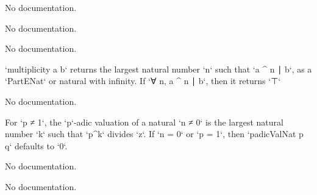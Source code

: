 \begin{definition}\label{CompleteValuationField}
        \leanok
                No documentation.
    \end{definition}

\begin{definition}\label{CompleteDiscreteValuationField}
        \leanok
                No documentation.
    \end{definition}

\begin{definition}\label{ValRingHom.ramificationIndex}
                No documentation.
    \end{definition}

\begin{definition}\label{multiplicity'}
        \leanok
                `multiplicity a b` returns the largest natural number `n` such that
  `a ^ n ∣ b`, as a `PartENat` or natural with infinity. If `∀ n, a ^ n ∣ b`,
  then it returns `⊤`
    \end{definition}

\begin{theorem}\label{finite_nat_iff'}
                No documentation.
    \end{theorem}

\begin{definition}\label{padicValNat'}
        \leanok
                For `p ≠ 1`, the `p`-adic valuation of a natural `n ≠ 0` is the largest natural number `k` such
that `p^k` divides `z`. If `n = 0` or `p = 1`, then `padicValNat p q` defaults to `0`.
    \end{definition}

\begin{theorem}\label{finite_ideal_iff}
                No documentation.
    \end{theorem}

\begin{theorem}\label{ord_top}
                No documentation.
    \end{theorem}

